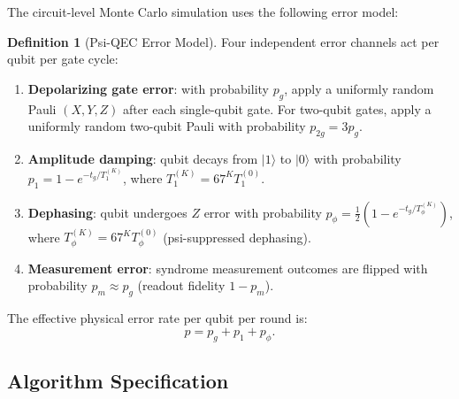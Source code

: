 \documentclass[11pt]{article}
\theoremstyle{definition}
\newtheorem{definition}[theorem]{Definition}
\theoremstyle{remark}
\begin{document}
The circuit-level Monte Carlo simulation uses the following error model:

\begin{definition}[Psi-QEC Error Model]
\label{def:error-model}
Four independent error channels act per qubit per gate cycle:
\begin{enumerate}
  \item \textbf{Depolarizing gate error}: with probability $p_g$, apply a uniformly
    random Pauli $(X, Y, Z)$ after each single-qubit gate.  For two-qubit gates,
    apply a uniformly random two-qubit Pauli with probability $p_{2g} = 3p_g$.
  \item \textbf{Amplitude damping}: qubit decays from $|1\rangle$ to $|0\rangle$
    with probability $p_1 = 1 - e^{-t_g/T_1^{(K)}}$, where $T_1^{(K)} = 67^K T_1^{(0)}$.
  \item \textbf{Dephasing}: qubit undergoes $Z$ error with probability
    $p_\phi = \tfrac{1}{2}(1 - e^{-t_g/T_\phi^{(K)}})$, where
    $T_\phi^{(K)} = 67^K T_\phi^{(0)}$ (psi-suppressed dephasing).
  \item \textbf{Measurement error}: syndrome measurement outcomes are flipped
    with probability $p_m \approx p_g$ (readout fidelity $1 - p_m$).
\end{enumerate}
The effective physical error rate per qubit per round is:
\begin{equation}
  p = p_g + p_1 + p_\phi.
  \label{eq:total-error}
\end{equation}
\end{definition}

\subsection{Algorithm Specification}
\label{sec:algorithm}
\end{document}
